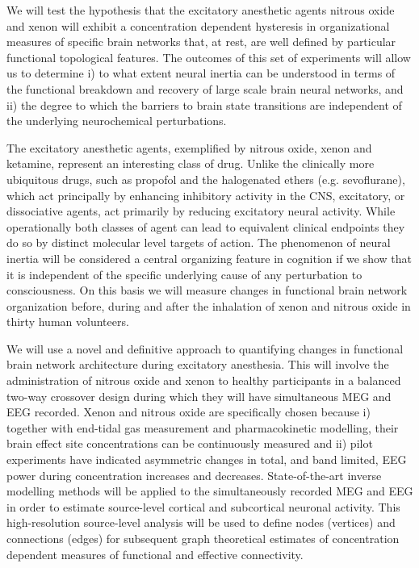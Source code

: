 \documentclass{article}
\begin{document}
We will test the hypothesis that the excitatory anesthetic agents nitrous oxide and xenon will exhibit a concentration dependent hysteresis in organizational measures of specific brain networks that, at rest, are well defined by particular functional topological features.  The outcomes of this set of experiments will allow us to determine i) to what extent neural inertia can be understood in terms of the functional breakdown and recovery of large scale brain neural networks, and ii) the degree to which the barriers to brain state transitions are independent of the underlying neurochemical perturbations.

The excitatory anesthetic agents, exemplified by nitrous oxide, xenon and ketamine, represent an interesting class of drug.  Unlike the clinically more ubiquitous drugs, such as propofol and the halogenated ethers (e.g. sevoflurane), which act principally by enhancing inhibitory activity in the CNS, excitatory, or dissociative agents, act primarily by reducing excitatory neural activity.  While operationally both classes of agent can lead to equivalent clinical endpoints they do so by distinct molecular level targets of action.  The phenomenon of neural inertia will be considered a central organizing feature in cognition if we show that it is independent of the specific underlying cause of any perturbation to consciousness.  On this basis we will measure changes in functional brain network organization before, during and after the inhalation of xenon and nitrous oxide in thirty human volunteers.

We will use a novel and definitive approach to quantifying changes in functional brain network architecture during excitatory anesthesia. This will involve the administration of nitrous oxide and xenon to healthy participants in a balanced two-way crossover design during which they will have simultaneous MEG and EEG recorded.  Xenon and nitrous oxide are specifically chosen because i) together with end-tidal gas measurement and pharmacokinetic modelling, their brain effect site concentrations can be continuously measured and ii) pilot experiments have indicated asymmetric changes in total, and band limited, EEG power during concentration increases and decreases.  State-of-the-art inverse modelling methods will be applied to the simultaneously recorded MEG and EEG in order to estimate source-level cortical and subcortical neuronal activity.  This high-resolution source-level analysis will be used to define nodes (vertices) and connections (edges) for subsequent graph theoretical estimates of concentration dependent measures of functional and effective connectivity.   
\end{document}
